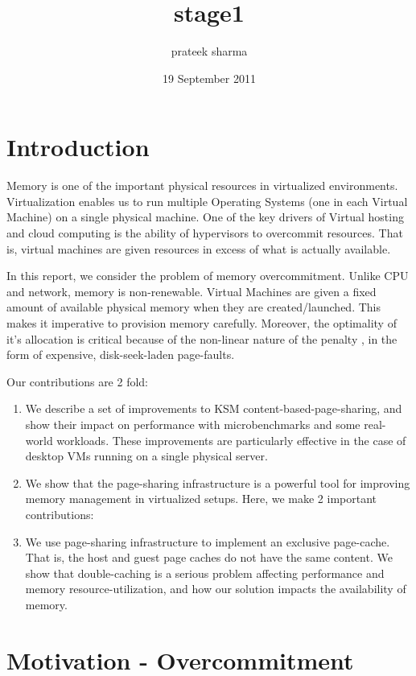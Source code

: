 \documentclass[11pt]{article}
\begin{document}
\title{stage1}
\author{prateek sharma}
\date{19 September 2011}
\maketitle

\setcounter{tocdepth}{3}
\tableofcontents
\vspace*{1cm}
\section{Introduction}
\label{sec-1}

Memory is one of the important physical resources in virtualized environments. Virtualization enables us to run multiple Operating Systems (one in each Virtual Machine) on a single physical machine. One of the key drivers of Virtual hosting and cloud computing is the ability of hypervisors to overcommit resources. That is, virtual machines are given resources in excess of what is actually available.

In this report, we consider the problem of memory overcommitment. Unlike CPU and network, memory is non-renewable. Virtual Machines are given a fixed amount of available physical memory when they are created/launched. This makes it imperative to provision memory carefully. Moreover, the optimality of it's allocation is critical because of the non-linear nature of the penalty , in the form of expensive, disk-seek-laden page-faults. 


Our contributions are 2 fold: 
\begin{enumerate}
\item We describe a set of improvements to KSM content-based-page-sharing, and show their impact on performance with microbenchmarks and some real-world workloads. These improvements are particularly effective in the case of desktop VMs running on a single physical server.
\item We show that the page-sharing infrastructure is a powerful tool for improving memory management in virtualized setups. Here, we make 2 important contributions:
\item We use page-sharing infrastructure to implement an exclusive page-cache. That is, the host and guest page caches do not have the same content. We show that double-caching is a serious problem affecting performance and memory resource-utilization, and how our solution impacts the availability of memory.
\end{enumerate}
  
\section{Motivation - Overcommitment}
\label{sec-2}
\end{document}
